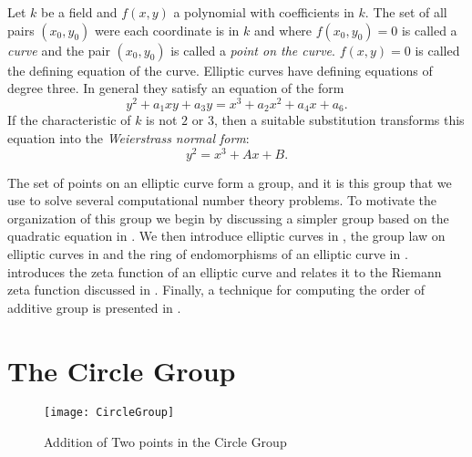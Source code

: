 \medskip

  
Let $k$ be a field and $f(x,y)$ a polynomial with coefficients in $k$.
The set of all pairs $(x_0, y_0)$ were each coordinate is in $k$ and where
$f(x_0,y_0) = 0$ is called a {\em curve} and the pair $(x_0,y_0)$ is
called a {\em point on the curve\/}.  $f(x, y) = 0$ is called the
defining equation of the curve.  Elliptic curves have defining equations
of degree three.  In general they satisfy an equation of the form
\[
y^2 + a_1 x y + a_3 y = x^3 + a_2 x^2 + a_4 x + a_6.
\]
If the characteristic of $k$ is not $2$ or $3$, then a
suitable substitution transforms this equation into the
{\em Weierstrass normal form\/}:
\[
y^2 = x^3 + A x + B.
\]

The set of points on an elliptic curve form a group, and it is this
group that we use to solve several computational number theory
problems.  To motivate the organization of this group we begin by
discussing a simpler group based on the quadratic equation in
.  We then introduce elliptic curves in
, the group law on elliptic curves in
 and the ring of endomorphisms of an
elliptic curve in .
 introduces the zeta function of an
elliptic curve and relates it to the Riemann zeta function discussed
in .  Finally, a technique for computing the
order of additive group is presented in .

\section{The Circle Group}
\label{Circle:Group:Sec}

\begin{figure}
\begin{center}
\texttt{[image: CircleGroup]}
\end{center}
\caption{Addition of Two points in the Circle Group\label{Circle:Group:Fig}}
\end{figure}

